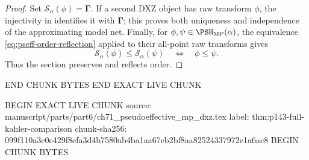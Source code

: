 \begin{proof}
Set \(\mathcal S_\alpha(\phi)=\boldsymbol\Gamma\).  If a second DXZ
object has raw transform \(\phi\), the injectivity in
 identifies it with
\(\boldsymbol\Gamma\); this proves both uniqueness and independence of the
approximating model net.  Finally, for \(\phi,\psi\in
\PSH_{\mathrm{MP}}(\alpha)\), the equivalence
\eqref{eq:pseff-order-reflection} applied to their all-point raw transforms
gives
\[
 \mathcal S_\alpha(\phi)\leq\mathcal S_\alpha(\psi)
 \quad\Longleftrightarrow\quad
 \phi\leq\psi.
\]
Thus the section preserves and reflects order.
\end{proof}
END CHUNK BYTES
END EXACT LIVE CHUNK

BEGIN EXACT LIVE CHUNK
source: manuscript/parts/part6/ch71_pseudoeffective_mp_dxz.tex
label: thm:p143-full-kahler-comparison
chunk-sha256: 099f110a3c0e429f8efa3d4b7580ab4ba1aa67eb2bf8aa82524337972e1a6ac8
BEGIN CHUNK BYTES
